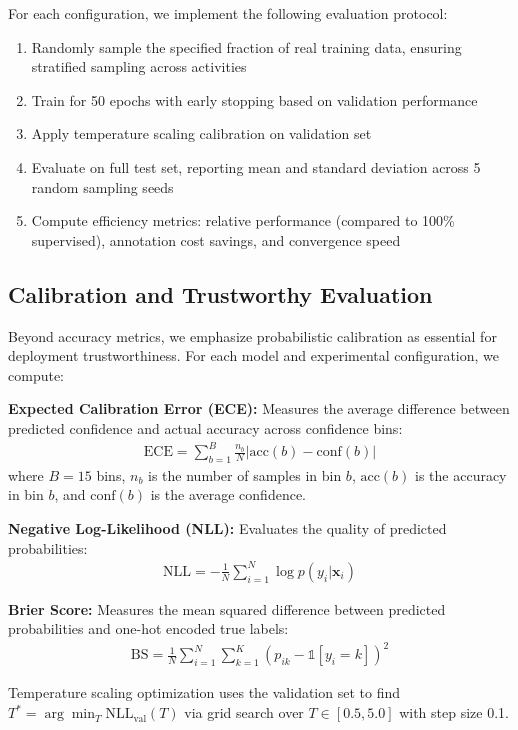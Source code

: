 \documentclass[journal]{IEEEtran}
\begin{document}
For each configuration, we implement the following evaluation protocol:
\begin{enumerate}
\item Randomly sample the specified fraction of real training data, ensuring stratified sampling across activities
\item Train for 50 epochs with early stopping based on validation performance
\item Apply temperature scaling calibration on validation set
\item Evaluate on full test set, reporting mean and standard deviation across 5 random sampling seeds
\item Compute efficiency metrics: relative performance (compared to 100\% supervised), annotation cost savings, and convergence speed
\end{enumerate}

\subsection{Calibration and Trustworthy Evaluation}
Beyond accuracy metrics, we emphasize probabilistic calibration as essential for deployment trustworthiness. For each model and experimental configuration, we compute:

\textbf{Expected Calibration Error (ECE):} Measures the average difference between predicted confidence and actual accuracy across confidence bins:
\begin{align}
\text{ECE} = \sum_{b=1}^{B} \frac{n_b}{N} |\text{acc}(b) - \text{conf}(b)|
\end{align}
where $B=15$ bins, $n_b$ is the number of samples in bin $b$, $\text{acc}(b)$ is the accuracy in bin $b$, and $\text{conf}(b)$ is the average confidence.

\textbf{Negative Log-Likelihood (NLL):} Evaluates the quality of predicted probabilities:
\begin{align}
\text{NLL} = -\frac{1}{N} \sum_{i=1}^{N} \log p(y_i | \mathbf{x}_i)
\end{align}

\textbf{Brier Score:} Measures the mean squared difference between predicted probabilities and one-hot encoded true labels:
\begin{align}
\text{BS} = \frac{1}{N} \sum_{i=1}^{N} \sum_{k=1}^{K} (p_{ik} - \mathbb{1}[y_i = k])^2
\end{align}

Temperature scaling optimization uses the validation set to find $T^* = \arg\min_T \text{NLL}_{\text{val}}(T)$ via grid search over $T \in [0.5, 5.0]$ with step size 0.1.
\end{document}

